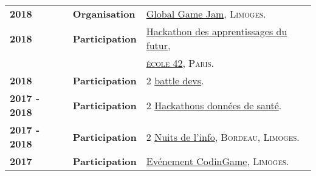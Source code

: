 \begin{supertabular}{lll}
    \textbf{2018} & \textbf{Organisation} & \href{https://globalgamejam.org}{Global Game Jam}, \textsc{Limoges}.\\
    \textbf{2018} & \textbf{Participation} & \href{https://www.concepteursdavenirs.fr/nos-evenements-et-concours/hackathon-des-apprentissages-du-futur}{Hackathon des apprentissages du futur},\\
    & & \textsc{\href{https://www.42.fr}{\'ecole 42}, Paris}.\\
    \textbf{2018} & \textbf{Participation} & 2 \href{https://battledev.blogdumoderateur.com}{battle devs}.\\
    \textbf{2017 - 2018} & \textbf{Participation} & 2 \href{https://www.3il-ingenieurs.fr/hackathon-3il-silpc}{Hackathons donn\'ees de sant\'e}.\\
    \textbf{2017 - 2018} & \textbf{Participation} & 2 \href{https://www.nuitdelinfo.com}{Nuits de l'info}, \textsc{Bordeau, Limoges}.\\
    \textbf{2017} & \textbf{Participation} & \href{https://www.codingame.com/profile/43f0f3f88101caf711a71a0e98985c711741781}{Ev\'enement CodinGame}, \textsc{Limoges}.\\
\end{supertabular}
